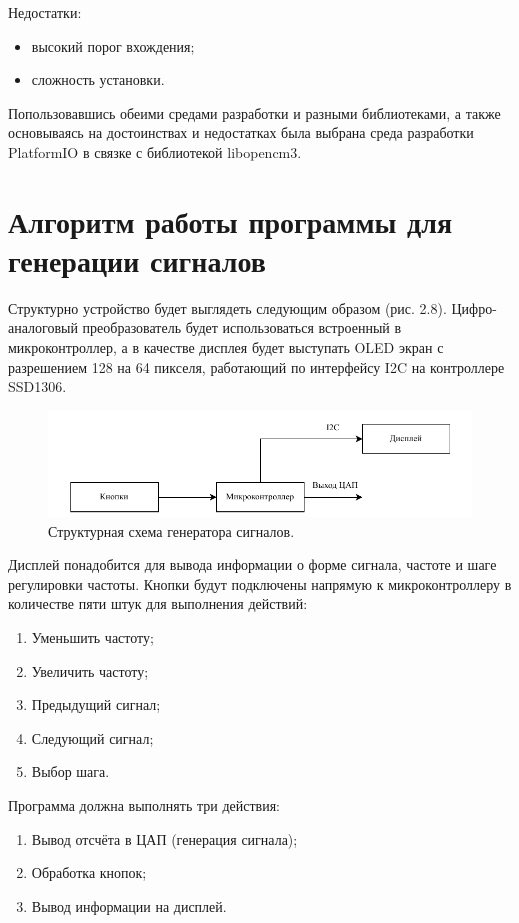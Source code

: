 	Недостатки:
	\begin{itemize}
		\item высокий порог вхождения;
		\item сложность установки.
	\end{itemize}

	Попользовавшись обеими средами разработки и разными библиотеками, а также основываясь на достоинствах и недостатках была выбрана среда разработки PlatformIO в связке с библиотекой libopencm3.


\section{Алгоритм работы программы для генерации сигналов}

	Структурно устройство будет выглядеть следующим образом (рис. 2.8). Цифро-аналоговый преобразователь будет использоваться встроенный в микроконтроллер, а в качестве дисплея будет выступать OLED экран с разрешением 128 на 64 пикселя, работающий по интерфейсу I2C на контроллере SSD1306.
	
	\begin{figure}[H]
    \centering
    \includegraphics[width=1\textwidth]{../image/struct_gen.pdf}
    \caption{Структурная схема генератора сигналов.}
	\end{figure}
	
	Дисплей понадобится для вывода информации о форме сигнала, частоте и шаге регулировки частоты. Кнопки будут подключены напрямую к микроконтроллеру в количестве пяти штук для выполнения действий:
	\begin{enumerate}
		\item Уменьшить частоту;
		\item Увеличить частоту;
		\item Предыдущий сигнал;
		\item Следующий сигнал;
		\item Выбор шага.
	\end{enumerate}

	Программа должна выполнять три действия:
	
	\begin{enumerate}
		\item Вывод отсчёта в ЦАП (генерация сигнала);
		\item Обработка кнопок;
		\item Вывод информации на дисплей.
	\end{enumerate}
	
